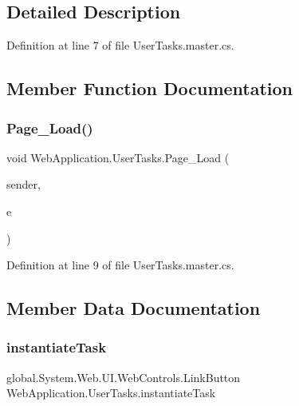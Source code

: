 \subsection{Detailed Description}


Definition at line 7 of file User\+Tasks.\+master.\+cs.



\subsection{Member Function Documentation}
\mbox{\label{classWebApplication_1_1UserTasks_a741bea9ced0083590cfa88d43b5441df}} 
\subsubsection{\texorpdfstring{Page\_Load()}{Page\_Load()}}
{\footnotesize\ttfamily void Web\+Application.\+User\+Tasks.\+Page\+\_\+\+Load (\begin{DoxyParamCaption}\item[{object}]{sender,  }\item[{Event\+Args}]{e }\end{DoxyParamCaption})\hspace{0.3cm}{\ttfamily [protected]}}



Definition at line 9 of file User\+Tasks.\+master.\+cs.



\subsection{Member Data Documentation}
\mbox{\label{classWebApplication_1_1UserTasks_a7ec5d9265d11d31008f586487e1f31c2}} 
\subsubsection{\texorpdfstring{instantiateTask}{instantiateTask}}
{\footnotesize\ttfamily global.\+System.\+Web.\+U\+I.\+Web\+Controls.\+Link\+Button Web\+Application.\+User\+Tasks.\+instantiate\+Task\hspace{0.3cm}{\ttfamily [protected]}}



